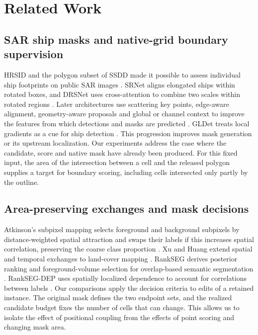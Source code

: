 \documentclass[journal]{IEEEtran}
\begin{document}
\section{Related Work}
\label{sec:related-work}

\subsection{SAR ship masks and native-grid boundary supervision}
HRSID and the polygon subset of SSDD made it possible to assess individual ship footprints on public SAR images \cite{hrsid,ssdd}. SRNet aligns elongated ships within rotated boxes, and DRSNet uses cross-attention to combine two scales within rotated regions \cite{rsdd,drsnet}. Later architectures use scattering key points, edge-aware alignment, geometry-aware proposals and global or channel context to improve the features from which detections and masks are predicted \cite{gao2024,aranet,dacf,gcie,dsr}. GLDet treats local gradients as a cue for ship detection \cite{gldet}. This progression improves mask generation or its upstream localization. Our experiments address the case where the candidate, score and native mask have already been produced. For this fixed input, the area of the intersection between a cell and the released polygon supplies a target for boundary scoring, including cells intersected only partly by the outline.

\subsection{Area-preserving exchanges and mask decisions}
Atkinson's subpixel mapping selects foreground and background subpixels by distance-weighted spatial attraction and swaps their labels if this increases spatial correlation, preserving the coarse class proportion \cite{atkinson}. Xu and Huang extend spatial and temporal exchanges to land-cover mapping \cite{xu}. RankSEG derives posterior ranking and foreground-volume selection for overlap-based semantic segmentation \cite{rankseg}. RankSEG-DEP uses spatially localized dependence to account for correlations between labels \cite{rankdep}. Our comparisons apply the decision criteria to edits of a retained instance. The original mask defines the two endpoint sets, and the realized candidate budget fixes the number of cells that can change. This allows us to isolate the effect of positional coupling from the effects of point scoring and changing mask area.
\end{document}
